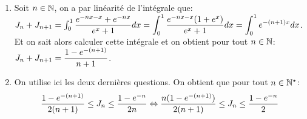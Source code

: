 \documentclass[a4paper, 11pt,reqno]{article}
\begin{document}
\begin{correction}
\begin{enumerate}
\begin{itemize}
\begin{itemize}
				            \item[$\star$] Ainsi on a: $J_{n+1}-J_n=\int_0^1 \ddp\frac{ e^{-nx}(e^{-x}-1)  }{e^x+1}dx$. De plus comme une exponentielle est toujours strictement positive, on sait que $e^{-nx}>0$ et que $e^{x}+1>0$ comme somme de deux termes strictement positifs. Ainsi il reste \`{a} \'etudier le signe de $e^{-x}-1$. Or on a: $e^{-x}-1<0\Leftrightarrow e^{-x}<1\Leftrightarrow -x<0\Leftrightarrow x>0$ en utilisant le fait que la fonction logarithme n\'ep\'erien est strictement croissante sur $\R^{+\star}$. Or on est sur $\lbrack 0,1\rbrack$ donc on a: $e^{-x}-1\leq 0$.
				            \item[$\star$] On a donc:
				                  \begin{itemize}
					                  \item[$\circ$] La fonction $x\mapsto \ddp\frac{ e^{-nx}(e^{-x}-1)  }{e^x+1}$ est continue sur $\lbrack 0,1\rbrack$ comme compos\'ee, somme, produit et quotient de fonctions continues.
					                  \item[$\circ$] $0\leq 1$.
					                  \item[$\circ$] Pour tout $x\in\lbrack 0,1\rbrack$: $\ddp\frac{ e^{-nx}(e^{-x}-1)  }{e^x+1} \leq 0$.
				                  \end{itemize}
				                  Ainsi d'apr\`{e}s le th\'eor\`{e}me de n\'egativit\'e de l'int\'egrale, on obtient que: $J_{n+1}-J_n\leq 0\Leftrightarrow J_{n+1}\leq J_n$. Ainsi la suite est bien d\'ecroissante.
			            \end{itemize}
			      \item[$\bullet$] Soit $n\in\N^{\star}$. Comme la suite est d\'ecroissante, on a: $J_{n+1}\leq J_n\leq J_{n-1}$. Et ainsi, on a: $J_{n+1}+J_n\leq 2J_n\leq J_n+J_{n-1}\Leftrightarrow \ddp\demi (J_{n+1}+J_n) \leq J_n\leq \ddp\demi (J_n+J_{n-1})$.
		      \end{itemize}
		\item Soit $n\in\mathbb{N}$, on a par lin\'earit\'e de l'int\'egrale que: $J_n+J_{n+1}=\int_0^1 \displaystyle\frac{e^{-nx-x}+e^{-nx}}{e^x+1}dx=\int_0^1 \displaystyle\frac{e^{-nx-x}(1+e^x)}{e^x+1}dx=\int_0^1 e^{-(n+1)x}dx$. Et on sait alors calculer cette int\'egrale et on obtient pour tout $n\in\mathbb{N}$: $J_n+J_{n+1}=\displaystyle\frac{1-e^{-(n+1)}}{n+1}$.
		\item
		      On utilise ici les deux derni\`{e}res questions. On obtient que pour tout $n\in\N^{\star}$:
		      $$ \displaystyle\frac{1-e^{-(n+1)}}{2(n+1)}\leq J_n \leq  \displaystyle\frac{1-e^{-n}}{2n}\Leftrightarrow  \displaystyle\frac{n(1-e^{-(n+1)})}{2(n+1)}\leq J_n \leq  \displaystyle\frac{1-e^{-n}}{2}$$

\end{enumerate}
\end{correction}
\end{document}
